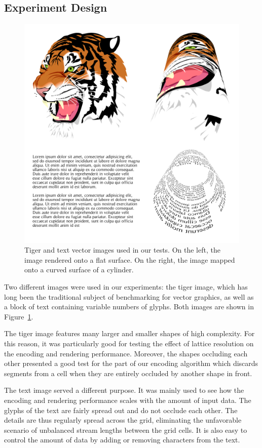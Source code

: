 \documentclass[11pt,a4paper,twoside]{article}
\begin{document}
\subsection {Experiment Design}

\begin {figure} [b!]
	\centering
	\includegraphics[width=0.8\columnwidth] {figures/screenshots}
	\caption {Tiger and text vector images used in our tests. On the left, the image rendered onto a flat surface. On the right, the image mapped onto a curved surface of a cylinder.}
	\label {fig:screenshots}
\end {figure}

Two different images were used in our experiments: the tiger image, which has long been the traditional subject of benchmarking for vector graphics, as well as a block of text containing variable numbers of glyphs. Both images are shown in Figure~\ref{fig:screenshots}.

The tiger image features many larger and smaller shapes of high complexity. For this reason, it was particularly good for testing the effect of lattice resolution on the encoding and rendering performance. Moreover, the shapes occluding each other presented a good test for the part of our encoding algorithm which discards segments from a cell when they are entirely occluded by another shape in front.

The text image served a different purpose. It was mainly used to see how the encoding and rendering performance scales with the amount of input data. The glyphs of the text are fairly spread out and do not occlude each other. The details are thus regularly spread across the grid, eliminating the unfavorable scenario of unbalanced stream lengths between the grid cells. It is also easy to control the amount of data by adding or removing characters from the text.
\end{document}

